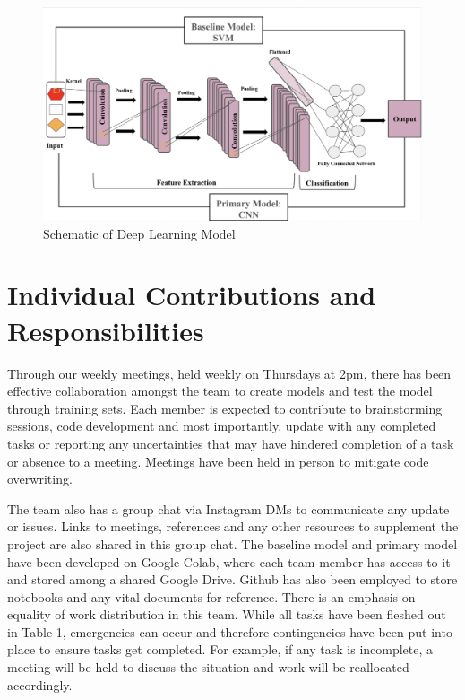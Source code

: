 \documentclass{article} %
\begin{document}
\newpage

\begin{figure}[h]
\begin{center}
\includegraphics[width=\textwidth]{Figs/project_desc.png}
\end{center}
\caption{Schematic of Deep Learning Model }
\end{figure} 


\section{Individual Contributions and Responsibilities}
Through our weekly meetings, held weekly on Thursdays at 2pm, there has been effective collaboration amongst the team to create models and test the model through training sets. Each member is expected to contribute to brainstorming sessions, code development and most importantly, update with any completed tasks or reporting any uncertainties that may have hindered completion of a task or absence to a meeting. Meetings have been held in person to mitigate code overwriting. 

The team also has a group chat via Instagram DMs to communicate any update or issues. Links to meetings, references and any other resources to supplement the project are also shared in this group chat. The baseline model and primary model have been developed on Google Colab, where each team member has access to it and stored among a shared Google Drive. Github has also been employed to store notebooks and any vital documents for reference. 
There is an emphasis on equality of work distribution in this team. While all tasks have been fleshed out in Table 1, emergencies can occur and therefore contingencies have been put into place to ensure tasks get completed. For example, if any task is incomplete, a meeting will be held to discuss the situation and work will be reallocated accordingly. 
\end{document}

